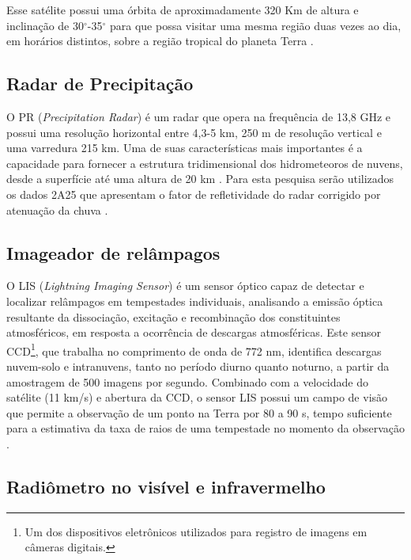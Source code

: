 
Esse satélite possui uma órbita de aproximadamente 320 Km de altura e inclinação de 30$^{\circ}$-35$^{\circ}$ para que possa visitar uma mesma região duas vezes ao dia, em horários distintos, sobre a região tropical do planeta Terra \cite{simpson1988}.   

\subsection{Radar de Precipitação}

O PR (\textit{Precipitation Radar}) é um radar que opera na frequência de 13,8 GHz e possui uma resolução horizontal entre 4,3-5 km, 250 m de resolução vertical e uma varredura 215 km. Uma de suas características mais importantes é a capacidade para fornecer a estrutura tridimensional dos hidrometeoros de nuvens, desde a superfície até uma altura de 20 km \cite{kummerok1998}. Para esta pesquisa serão utilizados os dados 2A25 que apresentam o fator de refletividade do radar corrigido por atenuação da chuva \cite{2A25}.

\subsection{Imageador de relâmpagos}

O LIS (\textit{Lightning Imaging Sensor}) é um sensor óptico capaz de detectar e localizar relâmpagos em tempestades individuais, analisando a emissão óptica resultante da dissociação, excitação e recombinação dos constituintes atmosféricos, em resposta a ocorrência de descargas atmosféricas. Este sensor CCD\footnote{Um dos dispositivos eletrônicos utilizados para registro de imagens em câmeras digitais.}, que trabalha no comprimento de onda de 772 nm, identifica descargas nuvem-solo e intranuvens, tanto no período diurno quanto noturno, a partir da amostragem de 500 imagens por segundo. Combinado com a velocidade do satélite (11 km/s) e abertura da CCD, o sensor LIS possui um campo de visão que permite a observação de um ponto na Terra por 80 a 90 s, tempo suficiente para a estimativa da taxa de raios de uma tempestade no momento da observação \cite{christianTM,trmmhandbook}.

\subsection{Radiômetro no visível e infravermelho}

